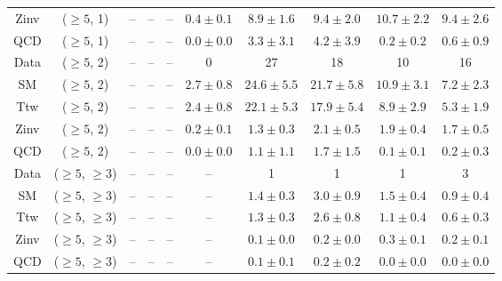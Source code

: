 \begin{table}[h!]
{\begin{tabular}{cccccccccc}
	Zinv & ($\ge5$, 1) & -- & -- & -- & $0.4\pm 0.1$ & $8.9\pm 1.6$ & $9.4\pm 2.0$ & $10.7\pm 2.2$ & $9.4\pm 2.6$ \\[0.5ex] 
	QCD & ($\ge5$, 1) & -- & -- & -- & $0.0\pm 0.0$ & $3.3\pm 3.1$ & $4.2\pm 3.9$ & $0.2\pm 0.2$ & $0.6\pm 0.9$ \\[0.5ex] 
	Data & ($\ge5$, 2) & -- & -- & -- & 0 & 27 & 18 & 10 & 16 \\[0.5ex] 
	SM & ($\ge5$, 2) & -- & -- & -- & $2.7\pm 0.8$ & $24.6\pm 5.5$ & $21.7\pm 5.8$ & $10.9\pm 3.1$ & $7.2\pm 2.3$ \\[0.5ex] 
	Ttw & ($\ge5$, 2) & -- & -- & -- & $2.4\pm 0.8$ & $22.1\pm 5.3$ & $17.9\pm 5.4$ & $8.9\pm 2.9$ & $5.3\pm 1.9$ \\[0.5ex] 
	Zinv & ($\ge5$, 2) & -- & -- & -- & $0.2\pm 0.1$ & $1.3\pm 0.3$ & $2.1\pm 0.5$ & $1.9\pm 0.4$ & $1.7\pm 0.5$ \\[0.5ex] 
	QCD & ($\ge5$, 2) & -- & -- & -- & $0.0\pm 0.0$ & $1.1\pm 1.1$ & $1.7\pm 1.5$ & $0.1\pm 0.1$ & $0.2\pm 0.3$ \\[0.5ex] 
	Data & ($\ge5$, $\ge3$) & -- & -- & -- & -- & 1 & 1 & 1 & 3 \\[0.5ex] 
	SM & ($\ge5$, $\ge3$) & -- & -- & -- & -- & $1.4\pm 0.3$ & $3.0\pm 0.9$ & $1.5\pm 0.4$ & $0.9\pm 0.4$ \\[0.5ex] 
	Ttw & ($\ge5$, $\ge3$) & -- & -- & -- & -- & $1.3\pm 0.3$ & $2.6\pm 0.8$ & $1.1\pm 0.4$ & $0.6\pm 0.3$ \\[0.5ex] 
	Zinv & ($\ge5$, $\ge3$) & -- & -- & -- & -- & $0.1\pm 0.0$ & $0.2\pm 0.0$ & $0.3\pm 0.1$ & $0.2\pm 0.1$ \\[0.5ex] 
	QCD & ($\ge5$, $\ge3$) & -- & -- & -- & -- & $0.1\pm 0.1$ & $0.2\pm 0.2$ & $0.0\pm 0.0$ & $0.0\pm 0.0$ \\[0.5ex] 
	\hline
	\hline
\end{tabular}}
\end{table}
